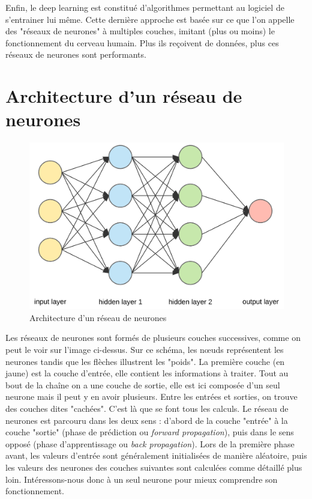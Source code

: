 	Enfin, le deep learning est constitué d'algorithmes permettant au logiciel de s'entrainer lui même. Cette dernière approche est basée sur ce que l'on appelle des "réseaux de neurones" à multiples couches, imitant (plus ou moins) le fonctionnement du cerveau humain. Plus ils reçoivent de données, plus ces réseaux de neurones sont performants.
	
\section{Architecture d'un réseau de neurones}

	\begin{figure}[H]
		\centering
		\includegraphics[width=0.75\linewidth]{images/reseau}
		\caption{Architecture d'un réseau de neurones}
	\end{figure}
	\vspace{-10pt}
	Les réseaux de neurones sont formés de plusieurs couches successives, comme on peut le voir sur l'image ci-dessus. Sur ce schéma, les n\oe uds représentent les neurones tandis que les flèches illustrent les "poids". La première couche (en jaune) est la couche d'entrée, elle contient les informations à traiter. Tout au bout de la chaîne on a une couche de sortie, elle est ici composée d'un seul neurone mais il peut y en avoir plusieurs. Entre les entrées et sorties, on trouve des couches dites "cachées". C'est là que se font tous les calculs. Le réseau de neurones est parcouru dans les deux sens : d'abord de la couche "entrée" à la couche "sortie" (phase de prédiction ou \textit{forward propagation}), puis dans le sens opposé (phase d'apprentissage ou \textit{back propagation}). Lors de la première phase avant, les valeurs d'entrée sont généralement initialisées de manière aléatoire, puis les valeurs des neurones des couches suivantes sont calculées comme détaillé plus loin. Intéressons-nous donc à un seul neurone pour mieux comprendre son fonctionnement.

